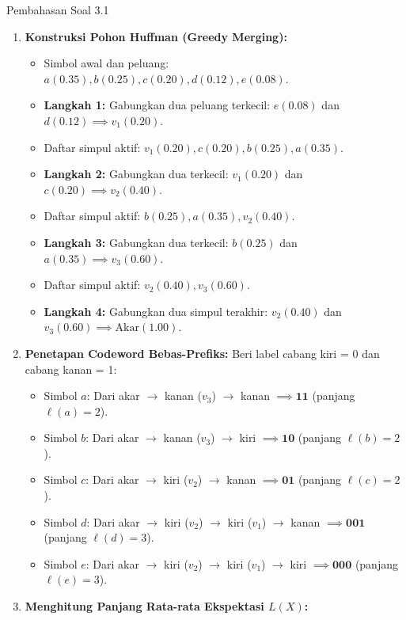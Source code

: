 \documentclass[11pt,a4paper]{article}
\begin{document}
\begin{solusibox}{Pembahasan Soal 3.1}
\begin{enumerate}[leftmargin=*]
    \item \textbf{Konstruksi Pohon Huffman (Greedy Merging):}
    \begin{itemize}
        \item Simbol awal dan peluang: $a(0.35), b(0.25), c(0.20), d(0.12), e(0.08)$.
        \item \textbf{Langkah 1:} Gabungkan dua peluang terkecil: $e(0.08)$ dan $d(0.12) \implies v_1(0.20)$.
        \item Daftar simpul aktif: $v_1(0.20), c(0.20), b(0.25), a(0.35)$.
        \item \textbf{Langkah 2:} Gabungkan dua terkecil: $v_1(0.20)$ dan $c(0.20) \implies v_2(0.40)$.
        \item Daftar simpul aktif: $b(0.25), a(0.35), v_2(0.40)$.
        \item \textbf{Langkah 3:} Gabungkan dua terkecil: $b(0.25)$ dan $a(0.35) \implies v_3(0.60)$.
        \item Daftar simpul aktif: $v_2(0.40), v_3(0.60)$.
        \item \textbf{Langkah 4:} Gabungkan dua simpul terakhir: $v_2(0.40)$ dan $v_3(0.60) \implies \text{Akar}(1.00)$.
    \end{itemize}
    \item \textbf{Penetapan Codeword Bebas-Prefiks:}
    Beri label cabang kiri = 0 dan cabang kanan = 1:
    \begin{itemize}
        \item Simbol $a$: Dari akar $\to$ kanan ($v_3$) $\to$ kanan $\implies \mathbf{11}$ (panjang $\ell(a) = 2$).
        \item Simbol $b$: Dari akar $\to$ kanan ($v_3$) $\to$ kiri $\implies \mathbf{10}$ (panjang $\ell(b) = 2$).
        \item Simbol $c$: Dari akar $\to$ kiri ($v_2$) $\to$ kanan $\implies \mathbf{01}$ (panjang $\ell(c) = 2$).
        \item Simbol $d$: Dari akar $\to$ kiri ($v_2$) $\to$ kiri ($v_1$) $\to$ kanan $\implies \mathbf{001}$ (panjang $\ell(d) = 3$).
        \item Simbol $e$: Dari akar $\to$ kiri ($v_2$) $\to$ kiri ($v_1$) $\to$ kiri $\implies \mathbf{000}$ (panjang $\ell(e) = 3$).
    \end{itemize}
    \item \textbf{Menghitung Panjang Rata-rata Ekspektasi $L(X)$:}

\end{enumerate}
\end{solusibox}
\end{document}
